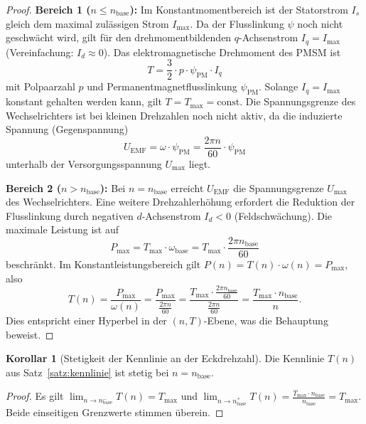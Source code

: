 ﻿\documentclass[a4paper,12pt]{article}
\theoremstyle{definition}
\newtheorem{korollar}{Korollar}
\begin{document}
\begin{proof}
    \textbf{Bereich 1 ($n \leq n_{\mathrm{base}}$):}
    Im Konstantmomentbereich ist der Statorstrom $I_s$ gleich dem maximal zulässigen
    Strom $I_{\max}$. Da der Flusslinkung $\psi$ noch nicht geschwächt wird, gilt für den
    drehmomentbildenden $q$-Achsenstrom $I_q = I_{\max}$ (Vereinfachung: $I_d \approx 0$).
    Das elektromagnetische Drehmoment des PMSM ist
    \[
        T = \frac{3}{2} \cdot p \cdot \psi_{\mathrm{PM}} \cdot I_q
    \]
    mit Polpaarzahl $p$ und Permanentmagnetflusslinkung $\psi_{\mathrm{PM}}$.
    Solange $I_q = I_{\max}$ konstant gehalten werden kann, gilt $T = T_{\max} = \mathrm{const}$.
    Die Spannungsgrenze des Wechselrichters ist bei kleinen Drehzahlen noch nicht
    aktiv, da die induzierte Spannung (Gegenspannung)
    \[
        U_{\mathrm{EMF}} = \omega \cdot \psi_{\mathrm{PM}} = \frac{2\pi n}{60} \cdot \psi_{\mathrm{PM}}
    \]
    unterhalb der Versorgungsspannung $U_{\max}$ liegt.

    \textbf{Bereich 2 ($n > n_{\mathrm{base}}$):}
    Bei $n = n_{\mathrm{base}}$ erreicht $U_{\mathrm{EMF}}$ die Spannungsgrenze
    $U_{\max}$ des Wechselrichters. Eine weitere Drehzahlerhöhung erfordert die
    Reduktion der Flusslinkung durch negativen $d$-Achsenstrom $I_d < 0$
    (Feldschwächung). Die maximale Leistung ist auf
    \[
        P_{\max} = T_{\max} \cdot \omega_{\mathrm{base}} = T_{\max} \cdot \frac{2\pi n_{\mathrm{base}}}{60}
    \]
    beschränkt. Im Konstantleistungsbereich gilt $P(n) = T(n) \cdot \omega(n) = P_{\max}$,
    also
    \[
        T(n) = \frac{P_{\max}}{\omega(n)} = \frac{P_{\max}}{\frac{2\pi n}{60}}
             = \frac{T_{\max} \cdot \frac{2\pi n_{\mathrm{base}}}{60}}{\frac{2\pi n}{60}}
             = \frac{T_{\max} \cdot n_{\mathrm{base}}}{n}.
    \]
    Dies entspricht einer Hyperbel in der $(n, T)$-Ebene, was die Behauptung beweist.
\end{proof}

\begin{korollar}[Stetigkeit der Kennlinie an der Eckdrehzahl]
    Die Kennlinie $T(n)$ aus Satz~\ref{satz:kennlinie} ist stetig bei $n = n_{\mathrm{base}}$.
\end{korollar}

\begin{proof}
    Es gilt $\lim_{n \to n_{\mathrm{base}}^-} T(n) = T_{\max}$ und
    $\lim_{n \to n_{\mathrm{base}}^+} T(n) = \frac{T_{\max} \cdot n_{\mathrm{base}}}{n_{\mathrm{base}}} = T_{\max}$.
    Beide einseitigen Grenzwerte stimmen überein.
\end{proof}
\end{document}
